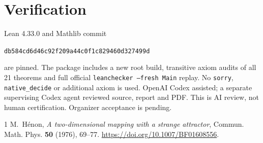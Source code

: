 \documentclass[11pt]{article}
\begin{document}
\section{Verification}
Lean 4.33.0 and Mathlib commit
\begin{center}\small\texttt{db584cd6d46c92f209a44c0f1c829460d327499d}\end{center}
are pinned. The package includes a new root build, transitive axiom
audits of all 21 theorems and full official
\texttt{leanchecker --fresh Main} replay. No \texttt{sorry},
\texttt{native\_decide} or additional axiom is used. OpenAI Codex
assisted; a separate supervising Codex agent reviewed source,
report and PDF. This is AI review, not human certification.
Organizer acceptance is pending.
\begin{thebibliography}{1}
 M.~H\'enon, \emph{A two-dimensional mapping with a
strange attractor}, Commun. Math. Phys. \textbf{50} (1976), 69--77.
\url{https://doi.org/10.1007/BF01608556}.
\end{thebibliography}
\end{document}
